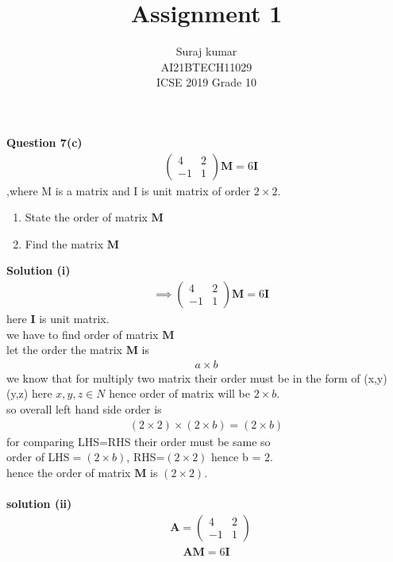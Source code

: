\documentclass[journal,12pt,twocolumn]{IEEEtran}
\title{Assignment 1}
\author{Suraj kumar \\ \normalsize AI21BTECH11029\\\vspace*{20pt} \Large ICSE 2019 Grade 10}
\let\vec\mathbf
\newcommand{\myvec}[1]{\ensuremath{\begin{pmatrix}#1\end{pmatrix}}}
\begin{document}
\maketitle

\textbf{Question 7(c)}\begin{align*} &\myvec{4 & 2 \\-1 & 1 } \vec{M}=6 \vec{I}\end{align*}
,where M is a matrix and I is unit matrix of order $2\times 2.$
\begin{enumerate}[label=(\roman*)]
  \item State the order of matrix $\vec{M}$
  \item Find the matrix $\vec{M}$
\end{enumerate}

\textbf{Solution (i) }
\begin{align}
     & \implies \myvec{
  4  & 2                     \\
  -1 & 1
  }\vec{M}=6\vec{I}
\end{align}
here $\vec{I}$ is unit matrix.\\
we have to find order of matrix $\vec{M}$\\
let the order the matrix $\vec{M}$ is
\begin{align}
  a\times b
\end{align}
we know that for multiply two matrix their order must be in the form of  (x,y) (y,z)  here $x,y,z \in N$
hence order of matrix will be $2\times b$.\\
so overall left hand side order is
\begin{align}
  (2\times 2)\times(2\times b) =(2\times b)
\end{align}
for comparing LHS=RHS their order must be same so \\
order of LHS$=(2\times b)$,
RHS=$(2\times 2)$  hence b = 2.\\
hence the order of matrix $\vec{M}$ is $(2\times 2).$\\\\
\textbf{solution (ii)}\\
\begin{align}
     & \vec{A}=\myvec{
  4  & 2               \\
  -1 & 1
  }
\end{align}
\begin{align}
  \vec{A}\vec{M}=6\vec{I}
\end{align}
\end{document}
